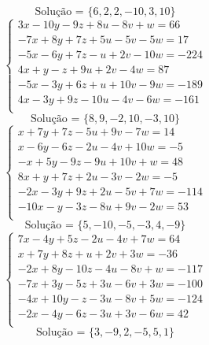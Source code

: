 \documentclass[12pt,oneside,a4paper]{article}
\begin{document}
\begin{equation*}
\text{Solução = }\{6,2,2,-10,3,10\}
\end{equation*}
\vspace{\baselineskip}
\begin{equation*}
\begin{cases}
3x-10y-9z+8u-8v+w=66 \\
-7x+8y+7z+5u-5v-5w=17 \\
-5x-6y+7z-u+2v-10w=-224 \\
4x+y-z+9u+2v-4w=87 \\
-5x-3y+6z+u+10v-9w=-189 \\
4x-3y+9z-10u-4v-6w=-161 \\
\end{cases}
\end{equation*}
\begin{equation*}
\text{Solução = }\{8,9,-2,10,-3,10\}
\end{equation*}
\vspace{\baselineskip}
\begin{equation*}
\begin{cases}
x+7y+7z-5u+9v-7w=14 \\
x-6y-6z-2u-4v+10w=-5 \\
-x+5y-9z-9u+10v+w=48 \\
8x+y+7z+2u-3v-2w=-5 \\
-2x-3y+9z+2u-5v+7w=-114 \\
-10x-y-3z-8u+9v-2w=53 \\
\end{cases}
\end{equation*}
\begin{equation*}
\text{Solução = }\{5,-10,-5,-3,4,-9\}
\end{equation*}
\vspace{\baselineskip}
\begin{equation*}
\begin{cases}
7x-4y+5z-2u-4v+7w=64 \\
x+7y+8z+u+2v+3w=-36 \\
-2x+8y-10z-4u-8v+w=-117 \\
-7x+3y-5z+3u-6v+3w=-100 \\
-4x+10y-z-3u-8v+5w=-124 \\
-2x-4y-6z-3u+3v-6w=42 \\
\end{cases}
\end{equation*}
\begin{equation*}
\text{Solução = }\{3,-9,2,-5,5,1\}
\end{equation*}
\end{document}
